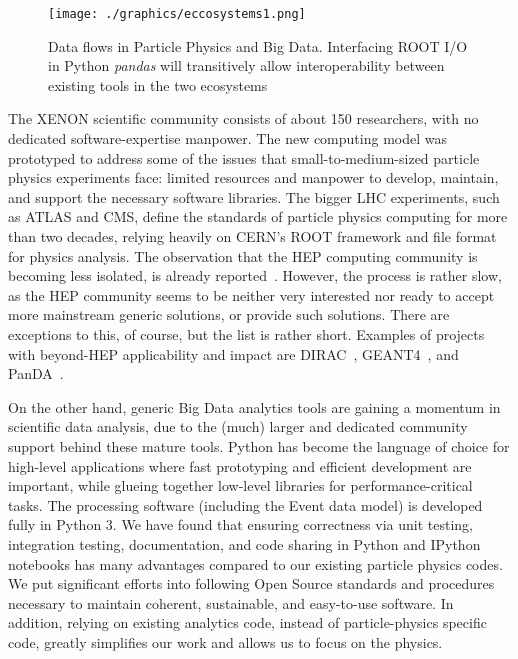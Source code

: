 \documentclass[a4paper]{jpconf}
\begin{document}
\begin{figure}[!t]
\centering
\begin{center}
\texttt{[image: ./graphics/eccosystems1.png]}
\caption{Data flows in Particle Physics and Big Data. Interfacing ROOT I/O in Python \textit{pandas} will transitively allow interoperability between existing tools in the two ecosystems}
\label{fig:two_eccosystems}
\end{center}
\end{figure}
The XENON scientific community consists of about 150 researchers, with no dedicated software-expertise manpower. 
The new computing model was prototyped to address some of the issues that small-to-medium-sized particle physics 
experiments face: limited resources and manpower to develop, maintain, and support the necessary software libraries.
The bigger LHC experiments, such as ATLAS and CMS, define the standards of particle physics computing for more than two decades, relying
heavily on CERN's ROOT framework and file format for physics analysis. 
The observation that the HEP computing community is becoming less isolated, is already reported~\cite{1742-6596-513-5-052033}.
However, the process is rather slow, as the HEP community seems to be neither very interested nor ready to accept more mainstream generic solutions, or provide such solutions.
There are exceptions to this, of course, but the list is rather short. 
Examples of projects with beyond-HEP applicability and impact are DIRAC~\cite{1742-6596-119-6-062048}, GEANT4~\cite{agostinelli2003geant4}, and PanDA~\cite{Borodin:1670021}.

On the other hand, generic Big Data analytics tools are gaining a momentum in scientific data analysis, due to the (much) larger and dedicated community support behind these mature tools.
Python has become the language of choice for high-level applications where fast 
prototyping and efficient development are important, while glueing together 
low-level libraries for performance-critical tasks.
The processing software (including the Event data model) is developed fully in Python 3. 
We have found that ensuring correctness via unit testing, integration testing, documentation, and code
sharing in Python and IPython notebooks has many advantages compared to our existing particle
physics codes. We put significant efforts into following Open Source standards and procedures necessary to maintain 
coherent, sustainable, and easy-to-use software. In addition, relying on existing analytics code, instead of particle-physics specific code, greatly
simplifies our work and allows us to focus on the physics.
\end{document}
